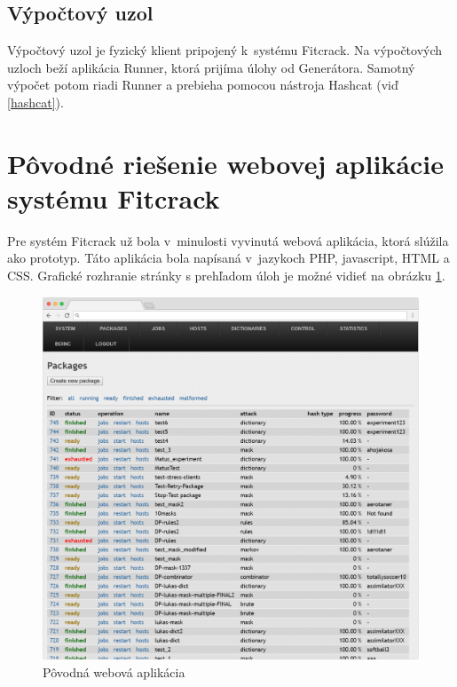 \documentclass[slovak]{fitthesis}
\begin{document}
\subsection{Výpočtový uzol}
Výpočtový uzol je fyzický klient pripojený k~systému Fitcrack. Na výpočtových uzloch beží aplikácia Runner, ktorá prijíma úlohy od Generátora. Samotný výpočet potom riadi Runner a prebieha pomocou nástroja Hashcat (viď \ref{hashcat}).



\section{Pôvodné riešenie webovej aplikácie systému Fitcrack}
Pre systém Fitcrack už bola v~minulosti vyvinutá webová aplikácia, ktorá slúžila ako prototyp. Táto aplikácia bola napísaná v~jazykoch PHP, javascript, HTML a CSS. Grafické rozhranie stránky s prehľadom úloh je možné vidieť na obrázku \ref{fig:oldFitcrack}.
\begin{figure}[H]
    \centering
    \includegraphics[scale=0.3]{obrazky/oldWebadminFrame.PNG}
    \caption{Pôvodná webová aplikácia}
    \label{fig:oldFitcrack}
\end{figure}
\end{document}
